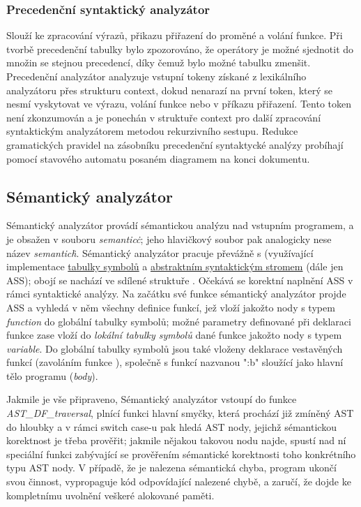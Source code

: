\documentclass[a4paper, 11pt]{article}
\begin{document}
	\subsubsection{Precedenční syntaktický analyzátor}
	Slouží ke zpracování výrazů, přikazu přiřazení do proměné a volání funkce. Při tvorbě precedenční tabulky bylo zpozorováno, že operátory je možné sjednotit 
	do množin se stejnou precedencí, díky čemuž bylo možné tabulku zmenšit. Precedenční analyzátor analyzuje vstupní tokeny získané z lexikálního analyzátoru 
	přes strukturu context, dokud nenarazí na první token, který se nesmí vyskytovat ve výrazu, volání funkce nebo v příkazu přiřazení. Tento token není 
	zkonzumován a je ponechán v struktuře context pro další zpracování syntaktickým analyzátorem metodou rekurzivního sestupu. Redukce gramatických
	pravidel na zásobníku precedenční syntaktycké analýzy probíhají pomocí stavového automatu posaném diagramem na konci 
	dokumentu.

	\subsection{Sémantický analyzátor}
	\label{semantic}
	Sémantický analyzátor provádí sémantickou analýzu nad vstupním programem, a je obsažen v souboru \textit{semantic\.c}; jeho hlavičkový soubor pak 
	analogicky nese název \textit{semantic\.h}. Sémantický analyzátor pracuje převážně s  (využívající implementace 
	\hyperref[symtab]{tabulky symbolů} a \hyperref[abstrtree]{abstraktním syntaktickým stromem} (dále jen ASS); obojí se nachází ve sdílené struktuře 
	. Očekává se korektní naplnění ASS v rámci 
	syntaktické analýzy. Na začátku své funkce sémantický analyzátor projde ASS a vyhledá v něm všechny definice funkcí, jež vloží jakožto nody s typem 	
	\textit{function} do globální tabulky symbolů; možné parametry definované při deklaraci funkce zase vloží do \textit{lokální tabulky symbolů} dané funkce 
	jakožto nody s typem \textit{variable}. Do globální tabulky symbolů jsou také vloženy deklarace vestavěných funkcí (zavoláním funkce ), společně s funkcí 
	nazvanou ":b" sloužící jako hlavní tělo programu (\textit{body}).

	Jakmile je vše připraveno, Sémantický analyzátor vstoupí do funkce \textit{AST\_DF\_traversal}, plnící funkci hlavní smyčky, která prochází již zmíněný AST 
	do hloubky a v rámci switch case-u pak hledá AST nody, jejichž sémantickou korektnost je třeba prověřit; jakmile nějakou takovou nodu najde, spustí nad ní 
	speciální funkci zabývající se prověřením sémantické korektnosti toho konkrétního typu AST nody. V případě, že je nalezena sémantická chyba, program 
	ukončí svou činnost, vypropaguje kód odpovídající nalezené chybě, a zaručí, že dojde ke kompletnímu uvolnění veškeré alokované paměti.
\end{document}
